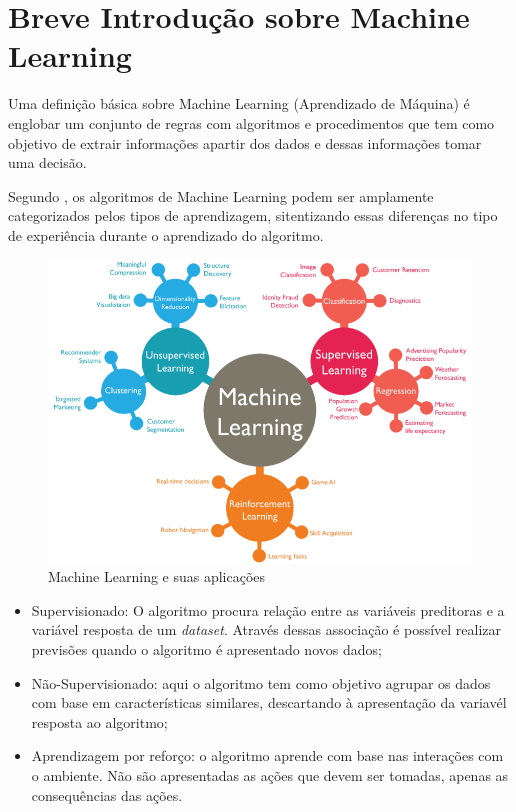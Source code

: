 \documentclass[
	12pt,				%
	openright,			%
	oneside,      %
	a4paper,			%
	english,			%
	french,				%
	spanish,			%
	brazil,				%
	]{abntex2}\usepackage[]{graphicx}\usepackage[table]{xcolor}
\theoremstyle{definition}
\begin{document}
  
  
  
  \section{Breve Introdução sobre Machine Learning}
  
Uma definição básica sobre Machine Learning (Aprendizado de Máquina) é englobar 
um conjunto de regras com algoritmos e procedimentos que tem como objetivo de 
extrair informações apartir dos dados e dessas informações tomar uma decisão.

Segundo \cite{goodfellow2016deep}, os algoritmos de Machine Learning podem ser 
amplamente categorizados pelos tipos de aprendizagem, sitentizando essas diferenças
no tipo de experiência durante o aprendizado do algoritmo.

    \begin{figure}
      \caption{\label{img1}Machine Learning e suas aplicações}
      \begin{center}
        \includegraphics[scale = 0.4]{image/img1.png}
      \end{center}
    \end{figure}
  
\begin{itemize}
  \item Supervisionado: O algoritmo procura relação entre as variáveis preditoras e 
  a variável resposta de um \textit{dataset}. Através dessas associação é possível 
  realizar previsões quando o algoritmo é apresentado novos dados;
  \item Não-Supervisionado: aqui o algoritmo tem como objetivo agrupar os dados com 
  base em características similares, descartando à apresentação da variavél resposta ao 
  algoritmo;
  \item Aprendizagem por reforço: o algoritmo aprende com base nas interações com o 
  ambiente. Não são apresentadas as ações que devem ser tomadas, apenas as consequências das ações.
\end{itemize}
\end{document}
